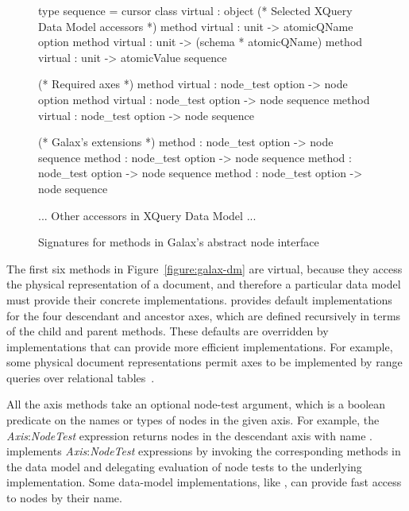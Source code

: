 \begin{figure*}
\begin{small}
\begin{code}
type sequence = cursor
class virtual  : 
object
  (* Selected XQuery Data Model accessors *)
  method virtual    : unit -> atomicQName option
  method virtual         : unit -> (schema * atomicQName)
  method virtual  : unit -> atomicValue sequence

  (* Required axes *)
  method virtual       : node_test option -> node option
  method virtual        : node_test option -> node sequence
  method virtual    : node_test option -> node sequence

  (* Galax's extensions *)
  method   : node_test option -> node sequence
  method           : node_test option -> node sequence
  method     : node_test option -> node sequence
  method             : node_test option -> node sequence

  ... Other accessors in XQuery Data Model ...
\end{code}
\end{small}
\caption{Signatures for methods in Galax's abstract node interface}
\label{figure :galax-dm}
\end{figure*}

The first six methods in Figure~\ref{figure:galax-dm} are virtual,
because they access the physical representation of a document, and
therefore a particular data model must provide their concrete
implementations.  \Galax{} provides default implementations for the
four {descendant} and ancestor axes, which are defined recursively in
terms of the {child} and {parent} methods.  These defaults are
overridden by implementations that can provide more efficient
implementations.  For example, some physical document representations
permit axes to be implemented by range queries over relational
tables~\cite{grust03staircase}.

All the axis methods take an optional node-test argument, which is a
boolean predicate on the names or types of nodes in the given axis.
For example, the \textit{Axis}:\textit{NodeTest} expression
 returns nodes in the descendant axis with name
.  \Galax{} implements \textit{Axis}:\textit{NodeTest}
expressions by invoking the corresponding methods in the data model
and delegating evaluation of node tests to the underlying
implementation.  Some data-model implementations, like \padx{}, can
provide fast access to nodes by their name.

